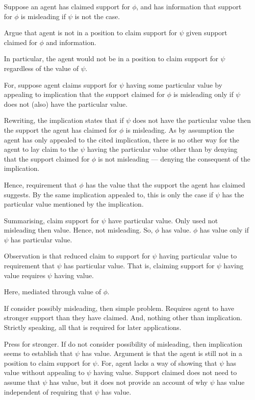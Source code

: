 \begin{note}
  \color{green}
  Suppose an agent has claimed support for \(\phi\), and has information that support for \(\phi\) is misleading if \(\psi\) is not the case.

  Argue that agent is not in a position to claim support for \(\psi\) given support claimed for \(\phi\) and information.

  In particular, the agent would not be in a position to claim support for \(\psi\) regardless of the value of \(\psi\).

  For, suppose agent claims support for \(\psi\) having some particular value by appealing to implication that the support claimed for \(\phi\) is misleading only if \(\psi\) does not (also) have the particular value.

  Rewriting, the implication states that if \(\psi\) does not have the particular value then the support the agent has claimed for \(\phi\) is misleading.
  As by assumption the agent has only appealed to the cited implication, there is no other way for the agent to lay claim to the \(\psi\) having the particular value other than by denying that the support claimed for \(\phi\) is not misleading --- denying the consequent of the implication.

  Hence, requirement that \(\phi\) has the value that the support the agent has claimed suggests.
  By the same implication appealed to, this is only the case if \(\psi\) has the particular value mentioned by the implication.

  Summarising, claim support for \(\psi\) have particular value.
  Only used not misleading then value.
  Hence, not misleading.
  So, \(\phi\) has value.
  \(\phi\) has value only if \(\psi\) has particular value.

  Observation is that reduced claim to support for \(\psi\) having particular value to requirement that \(\psi\) has particular value.
  That is, claiming support for \(\psi\) having value requires \(\psi\) having value.

  Here, mediated through value of \(\phi\).

  If consider possibly misleading, then simple problem.
  Requires agent to have stronger support than they have claimed.
  And, nothing other than implication.
  Strictly speaking, all that is required for later applications.

  Press for stronger.
  If do not consider possibility of misleading, then implication seems to establish that \(\psi\) has value.
  Argument is that the agent is still not in a position to claim support for \(\psi\).
  For, agent lacks a way of showing that \(\psi\) has value without appealing to \(\psi\) having value.
  Support claimed does not need to assume that \(\psi\) has value, but it does not provide an account of why \(\psi\) has value independent of requiring that \(\psi\) has value.



\end{note}
